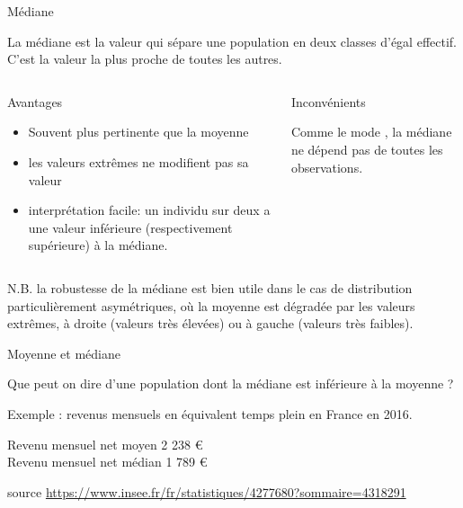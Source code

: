 \documentclass{beamer}
\begin{document}
\begin{frame}{Médiane}

La \alert{médiane} est la valeur qui sépare une population en \alert{deux} classes d'égal effectif.\\

C'est la valeur la plus proche de toutes les autres.




\begin{columns}[T,onlytextwidth]
\begin{block}{Avantages}
\begin{spacing}{0.9}
\begin{itemize}
\item Souvent plus pertinente que la moyenne
\item les valeurs extrêmes ne modifient pas sa valeur
\item interprétation  facile: un individu sur deux a une valeur inférieure (respectivement supérieure) à la médiane.
\end{itemize}
\end{spacing}
\end{block}
\begin{block}{Inconvénients}
\begin{spacing}{0.9}
Comme le mode , la médiane ne dépend pas de toutes les observations.
\end{spacing}
\end{block}
\end{columns}


\begin{tiny}
\begin{spacing}{0.9}
\alert{N.B.} la robustesse de la médiane est bien utile dans le cas de distribution particulièrement asymétriques, où la moyenne est dégradée par les valeurs extrêmes, à droite (valeurs très élevées) ou à gauche (valeurs très faibles).
\end{spacing}
\end{tiny}

\end{frame}




\begin{frame}{Moyenne et médiane}

Que peut on dire d'une population dont la médiane est inférieure à la moyenne ? 


Exemple : revenus mensuels en équivalent temps plein en France en 2016.

Revenu mensuel net moyen 2 238 €\\
Revenu mensuel net médian 1 789 € 

\vspace{2cm}
\begin{tiny}
source \url{https://www.insee.fr/fr/statistiques/4277680?sommaire=4318291}
\end{tiny}


\end{frame}
\end{document}
